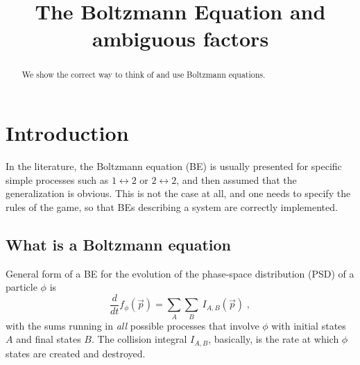 \documentclass[11pt,a4paper]{article}
\author{}
\title{The Boltzmann Equation and ambiguous factors}
\begin{document}
\maketitle
\begin{abstract} 
We show the correct way to think of and use Boltzmann equations. 
\end{abstract}
\flushbottom

\section{Introduction}\label{sec:intro}
\setcounter{equation}{0}
%
In the literature, the Boltzmann equation (BE) is usually presented for specific simple processes such as $1 \leftrightarrow 2$ or  $2 \leftrightarrow 2$, and then assumed that the generalization is obvious. This is not the case at all, and one needs to specify the rules of the game, so that  BEs describing a system  are correctly implemented.

\subsection{What is a Boltzmann equation}
General form of a BE for the evolution of the phase-space distribution (PSD) of a particle $\phi$ is 
%
\begin{equation}
\dfrac{d}{dt} f_{\phi} (\vec{p}) = \sum_{A} \sum_{B} \ I_{A,B}(\vec{p}) \;, 
\label{eq:GeneralBE}
\end{equation}
%
with the sums running in {\em all} possible processes that involve $\phi$ with initial states $A$ and final states $B$. The collision integral $I_{A,B}$, basically, is the rate at which $\phi$ states are created and destroyed. 
\end{document}
